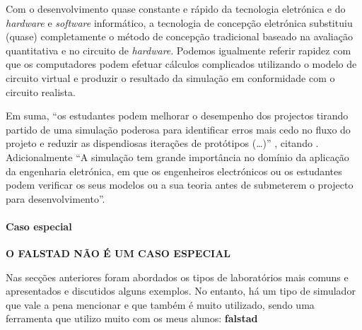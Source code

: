 Com o desenvolvimento quase constante e rápido da tecnologia eletrónica e do \textit{hardware} e \textit{software} informático, a tecnologia de concepção eletrónica substituiu (quase) completamente o método de concepção tradicional baseado na avaliação quantitativa e no circuito de \textit{hardware}. Podemos igualmente referir rapidez com que os computadores podem efetuar cálculos complicados utilizando o modelo de circuito virtual e produzir o resultado da simulação em conformidade com o circuito realista\cite{PSpiceSystemSimulation}.

Em suma, ``os estudantes podem melhorar o desempenho dos projectos tirando partido de uma simulação poderosa para identificar erros mais cedo no fluxo do projeto e reduzir as dispendiosas iterações de protótipos (\ldots)'' \cite{AvoidingCircuitErrorsMultisim}, citando \cite{ApplicationMultisimVirtualLaboratory}. Adicionalmente ``A simulação tem grande importância no domínio da aplicação da engenharia eletrónica, em que os engenheiros electrónicos ou os estudantes podem verificar os seus modelos ou a sua teoria antes de submeterem o projecto para desenvolvimento\cite{ImportantSimSoftware}''.

\paragraph{Caso especial}

\textbf{O FALSTAD NÃO É UM CASO ESPECIAL}

Nas secções anteriores foram abordados os tipos de laboratórios mais comuns e apresentados e discutidos alguns exemplos. No entanto, há um tipo de simulador que vale a pena mencionar e que também é muito utilizado, sendo uma ferramenta que utilizo muito com os meus alunos: \textbf{falstad}\cite{falstad}





